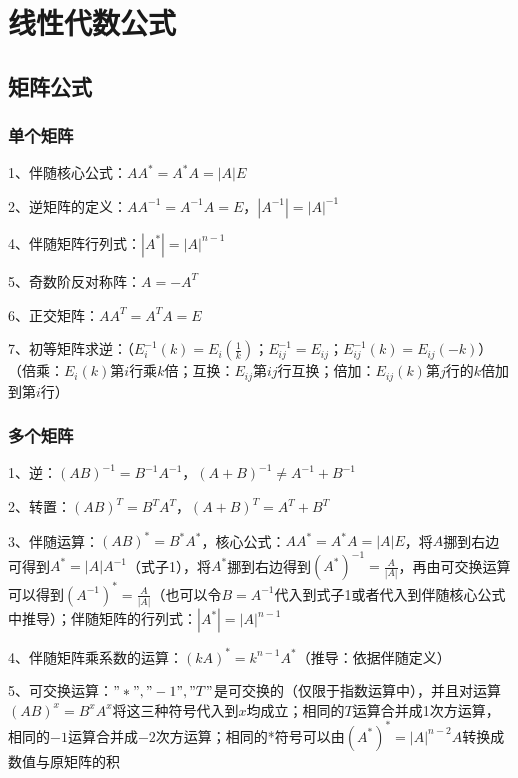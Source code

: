 \chapter{线性代数公式}

\section{矩阵公式}



\subsection{单个矩阵}

1、伴随核心公式：$AA^*=A^*A=|A|E$

2、逆矩阵的定义：$AA^{-1}=A^{-1}A=E$，$|A^{-1}|=|A|^{-1}$

4、伴随矩阵行列式：$|A^*|=|A|^{n-1}$

5、奇数阶反对称阵：$A=-A^T$

6、正交矩阵：$AA^T=A^TA=E$

7、初等矩阵求逆：（$E_{i}^{-1}(k)=E_{i}(\frac 1 k)$；$E_{ij}^{-1}=E_{ij}$；$E_{ij}^{-1}(k)=E_{ij}(-k)$）（倍乘：$E_{i}(k)$第$i$行乘$k$倍；互换：$E_{ij}$第$ij$行互换；倍加：$E_{ij}(k)$第$j$行的$k$倍加到第$i$行）



\subsection{多个矩阵}

1、逆：$(AB)^{-1}=B^{-1} A^{-1}$，$(A+B)^{-1}\ne A^{-1} + B^{-1}$

2、转置：$(AB)^T=B^TA^T$，$(A+B)^T=A^T + B^T$

3、伴随运算：$(AB)^*=B^*A^*$，核心公式：$AA^*=A^*A=|A|E$，将$A$挪到右边可得到$A^*=|A|A^{-1}$（式子1），将$A^*$挪到右边得到$(A^*)^{-1}=\frac{A}{|A|}$，再由可交换运算可以得到$(A^{-1})^*=\frac{A}{|A|}$（也可以令$B=A^{-1}$代入到式子1或者代入到伴随核心公式中推导）；伴随矩阵的行列式：$|A^*|=|A|^{n-1}$

4、伴随矩阵乘系数的运算：$(kA)^*=k^{n-1}A^*$（推导：依据伴随定义）

5、可交换运算：$"*","-1","T"$是可交换的（仅限于指数运算中），并且对运算$(AB)^x=B^xA^x$将这三种符号代入到$x$均成立；相同的$T$运算合并成1次方运算，相同的$-1$运算合并成$-2$次方运算；相同的*符号可以由$(A^*)^{*}=|A|^{n-2}A$转换成数值与原矩阵的积

